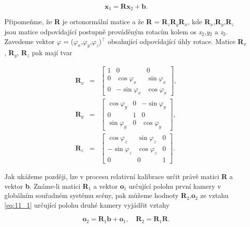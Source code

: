 \begin{equation} \label{eq:11_18}
    \mathbf{x}_{1} = \mathbf{R} \mathbf{x}_{2} + \mathbf{b}.
\end{equation}

Připomeňme, že \textbf{R} je ortonormální matice a že \textbf{R} = \textbf{R}$_{z}$\textbf{R}$_{y}$\textbf{R}$_{x}$, kde \textbf{R}$_{x}$,\textbf{R}$_{y}$,\textbf{R}$_{z}$ jsou matice odpovídající postupně prováděným rotacím kolem os \textit{x}$_2$,\textit{y}$_2$ a \textit{z}$_2$. Zavedeme vektor $\varphi$ = ($\varphi_x$,$\varphi_{y}$,$\varphi_{z}$)$^\top$ obsahující odpovídající úhly rotace. Matice \textbf{R}$_{x}$, \textbf{R}$_{y}$, \textbf{R}$_{z}$ pak mají tvar

\begin{eqnarray} \label{eq:11_19}
    \mathbf{R}_{x}
    &=&
    \left[
    \begin{array}{ccc}
    {1} & {0} & {0} \\
    {0} & {\cos \varphi _{x} } & {\sin \varphi _{x}} \\
    {0} & {-\sin \varphi _{x} } & {\cos \varphi _{x}}
    \end{array}
    \right], \\
    \mathbf{R}_{y}
    &=&
    \left[
    \begin{array}{ccc}
    {\cos \varphi _{y} } & {0} & {-\sin \varphi _{y} } \\
    {0} & {1} & {0} \\
    {\sin \varphi _{y}} & {0} & {\cos \varphi _{y}}
    \end{array}
    \right], \\
    \mathbf{R}_{z}
    &=&
    \left[
    \begin{array}{ccc}
    {\cos \varphi _{z}} & {\sin \varphi _{z}} & {0} \\
    {-\sin \varphi _{z} } & {\cos \varphi _{z} } & {0} \\
    {0} & {0} & {1}
    \end{array}
    \right].
\end{eqnarray}

Jak ukážeme později, lze v procesu relativní kalibrace určit právě matici \textbf{R} a vektor \textbf{b}. Známe-li matici \textbf{R}$_1$ a vektor \textbf{o}$_1$ určující polohu první kamery v globálním souřadném systému scény, pak můžeme hodnoty \textbf{R}$_2$,\textbf{o}$_2$ ze vztahu \eqref{eq:11_1} určující polohu druhé kamery vyjádřit vztahy

\begin{equation} \label{eq:11_20}
    \mathbf{o}_{2} = \mathbf{R}_{1} \mathbf{b} + \mathbf{o}_{1} , \quad \mathbf{R}_{2} = \mathbf{R}_{1} \mathbf{R}.
\end{equation}

